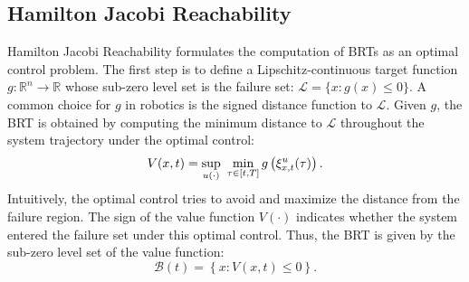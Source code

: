 \subsection{Hamilton Jacobi Reachability}
Hamilton Jacobi Reachability \cite{mitchell2005time, lygeros2004reachability} formulates the computation of BRTs as an optimal control problem. 
%
%
% 
The first step is to define a Lipschitz-continuous target function $g: \mathbb{R}^n \rightarrow \mathbb{R}$ whose sub-zero level set is the failure set: $\mathcal{L}=\{x: g(x) \leq 0\}$.
A common choice for $g$ in robotics is the signed distance function to $\mathcal{L}$.
%
Given $g$, the BRT is obtained by computing the minimum distance to $\mathcal{L}$ throughout the system trajectory under the optimal control:
% 
\vspace{-0.5em}
\begin{equation}
  V(x,t)  = \sup_{u(\cdot)} ~ \min _{\tau \in[t, T]} g\left(\xi_{x, t}^{u}(\tau)\right).
  \vspace{-0.5em}
\end{equation}
% 
Intuitively, the optimal control tries to avoid and maximize the distance from the failure region. 
The sign of the value function $V(\cdot)$ indicates whether the system entered the failure set under this optimal control. Thus, the BRT is given by the sub-zero level set of the value function:
% 
%
\vspace{-0.5em}
\begin{equation} \label{eq:BRT_from_value}
\mathcal{B}(t)=\left\{x: V(x,t)  \leq 0 \right\}.
\end{equation}
%

